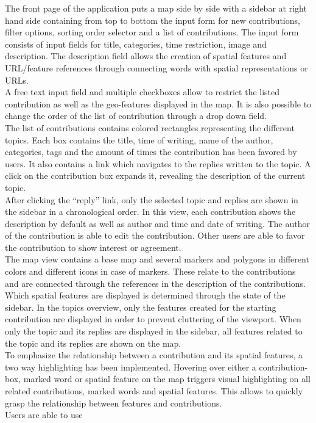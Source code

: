 \documentclass{sigchi}
\begin{document}
The front page of the application puts a map side by side with a sidebar at right hand side containing from top to bottom the input form for new contributions, filter options, sorting order selector and a list of contributions. The input form consists of input fields for title, categories, time restriction, image and description. The description field allows the creation of spatial features and URL/feature references through connecting words with spatial representations or URLs.\\
A free text input field and multiple checkboxes allow to restrict the listed contribution as well as the geo-features displayed in the map. It is also possible to change the order of the list of contribution through a drop down field.\\
The list of contributions contains colored rectangles representing the different topics. Each box contains the title, time of writing, name of the author, categories, tags and the amount of times the contribution has been favored by users. It also contains a link which navigates to the replies written to the topic. A click on the contribution box expands it, revealing the description of the current topic.\\
After clicking the ``reply'' link, only the selected topic and replies are shown in the sidebar in a chronological order. In this view, each contribution shows the description by default as well as author and time and date of writing. The author of the contribution is able to edit the contribution. Other users are able to favor the contribution to show interest or agreement.\\
The map view contains a base map and several markers and polygons in different colors and different icons in case of markers. These relate to the contributions and are connected through the references in the description of the contributions. Which spatial features are displayed is determined through the state of the sidebar. In the topics overview, only the features created for the starting contribution are displayed in order to prevent cluttering of the viewport. When only the topic and its replies are displayed in the sidebar, all features related to the topic and its replies are shown on the map.\\
To emphasize the relationship between a contribution and its spatial features, a two way highlighting has been implemented. Hovering over either a contribution-box, marked word or spatial feature on the map triggers visual highlighting on all related contributions, marked words and spatial features. This allows to quickly grasp the relationship between features and contributions.\\
Users are able to use 
\end{document}
